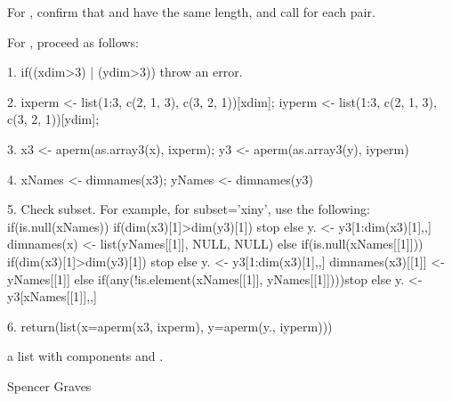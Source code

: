 \begin{Details}\relax
For , confirm that  and  have
the same length, and call  for each pair.  

For , proceed as follows:

1.  if((xdim>3) | (ydim>3)) throw an error.

2.  ixperm <- list(1:3, c(2, 1, 3), c(3, 2, 1))[xdim];
iyperm <- list(1:3, c(2, 1, 3), c(3, 2, 1))[ydim];

3.  x3 <- aperm(as.array3(x), ixperm);
y3 <- aperm(as.array3(y), iyperm) 

4.  xNames <- dimnames(x3);  yNames <- dimnames(y3) 

5.  Check subset.  For example, for subset='xiny', use the following:
if(is.null(xNames)){
if(dim(x3)[1]>dim(y3)[1]) stop
else y. <- y3[1:dim(x3)[1],,]
dimnames(x) <- list(yNames[[1]], NULL, NULL) 
}
else {
if(is.null(xNames[[1]])){
if(dim(x3)[1]>dim(y3)[1]) stop
else y. <- y3[1:dim(x3)[1],,]
dimnames(x3)[[1]] <- yNames[[1]]
}
else {
if(any(!is.element(xNames[[1]], yNames[[1]])))stop
else y. <- y3[xNames[[1]],,]
}
}

6.  return(list(x=aperm(x3, ixperm), y=aperm(y., iyperm)))
\end{Details}
\begin{Value}
a list with components  and .
\end{Value}
\begin{Author}\relax
Spencer Graves
\end{Author}
\begin{SeeAlso}\relax
{}
\end{SeeAlso}
